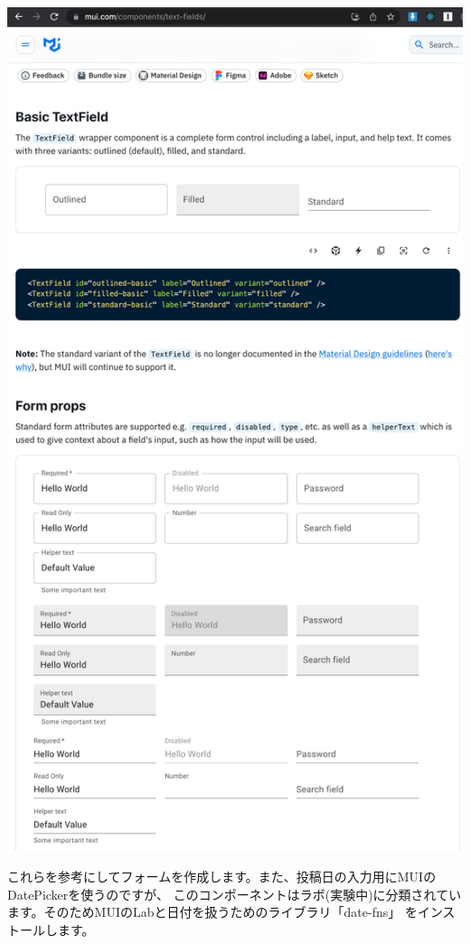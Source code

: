 \begin{reviewimage}[H]%
\includegraphics[width=0.6\maxwidth]{./images/03-todo-with-react/mui016-muisite-textField.png}%
\label{image:03-todo-with-react:mui016-muisite-textField}
\end{reviewimage}

これらを参考にしてフォームを作成します。また、投稿日の入力用にMUIのDatePickerを使うのですが、
このコンポーネントはラボ(実験中)に分類されています。そのためMUIのLabと日付を扱うためのライブラリ「date{-}fns」
をインストールします。

